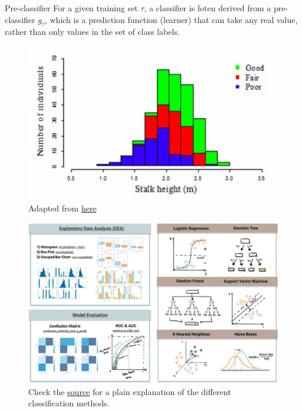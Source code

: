 \documentclass{beamer}
\begin{document}
\begin{frame}{Pre-classifier}
  For a given training set $\tau$, a classifier is foten derived from a pre-classifier $g_{\tau}$, which is a prediction function (learner) that can take any real value, rather than only values in the set of class labels.
  \begin{figure}
  \includegraphics[width=0.7\linewidth]{continuous_classification}
  \caption{Adapted from \href{https://www.scielo.br/j/cbab/a/Z8D4PknkTQxQjfx8NF4CZwj/?lang=en}{here}}
\end{figure}
\end{frame}

\begin{frame}
  \begin{figure}
    \includegraphics[width=0.8\linewidth]{classification}
    \caption{Check the \href{https://towardsdatascience.com/top-machine-learning-algorithms-for-classification-2197870ff501}{source} for a plain explanation of the different classification methods.}
  \end{figure}
  \end{frame}
\end{document}
